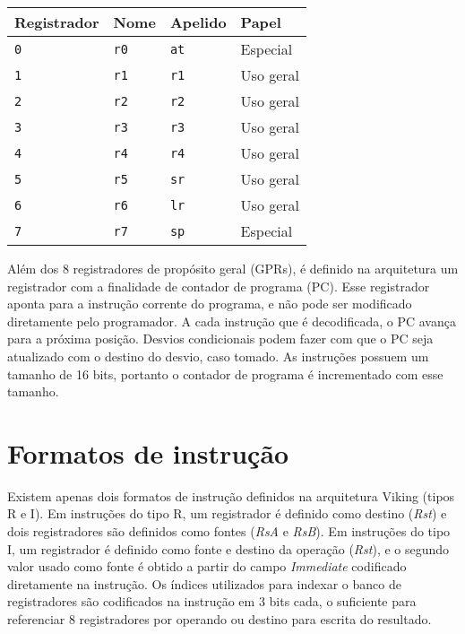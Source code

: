 \documentclass{extreport}
\begin{document}
\begin{table}[ht!]
\centering
\begin{tabular}{|p{2.5cm}|p{1.6cm}|p{1.6cm}|p{3.0cm}|}
\hline
\bf{Registrador} & \bf{Nome} & \bf{Apelido} & \bf{Papel} 		\\ \hline \hline
\texttt{0}	& \texttt{r0}	& \texttt{at}	& Especial		 \\ \hline
\texttt{1}	& \texttt{r1}	& \texttt{r1}	& Uso geral	 	\\ \hline
\texttt{2}	& \texttt{r2}	& \texttt{r2}	& Uso geral 		\\ \hline
\texttt{3}	& \texttt{r3}	& \texttt{r3}	& Uso geral 		\\ \hline
\texttt{4}	& \texttt{r4}	& \texttt{r4}	& Uso geral 		\\ \hline
\texttt{5}	& \texttt{r5}	& \texttt{sr}	& Uso geral 		\\ \hline
\texttt{6}	& \texttt{r6}	& \texttt{lr}	& Uso geral	 	\\ \hline
\texttt{7}	& \texttt{r7}	& \texttt{sp}	& Especial	 	\\ \hline
\end{tabular}
\end{table}

Além dos 8 registradores de propósito geral (GPRs), é definido na arquitetura um registrador com a finalidade de contador de programa (PC). Esse registrador aponta para a instrução corrente do programa, e não pode ser modificado diretamente pelo programador. A cada instrução que é decodificada, o PC avança para a próxima posição. Desvios condicionais podem fazer com que o PC seja atualizado com o destino do desvio, caso tomado. As instruções possuem um tamanho de 16 bits, portanto o contador de programa é incrementado com esse tamanho.

\section{Formatos de instrução}
Existem apenas dois formatos de instrução definidos na arquitetura Viking (tipos R e I). Em instruções do tipo R, um registrador é definido como destino (\textit{Rst}) e dois registradores são definidos como fontes (\textit{RsA} e \textit{RsB}). Em instruções do tipo I, um registrador é definido como fonte e destino da operação (\textit{Rst}), e o segundo valor usado como fonte é obtido a partir do campo \textit{Immediate} codificado diretamente na instrução. Os índices utilizados para indexar o banco de registradores são codificados na instrução em 3 bits cada, o suficiente para referenciar 8 registradores por operando ou destino para escrita do resultado.
\end{document}
